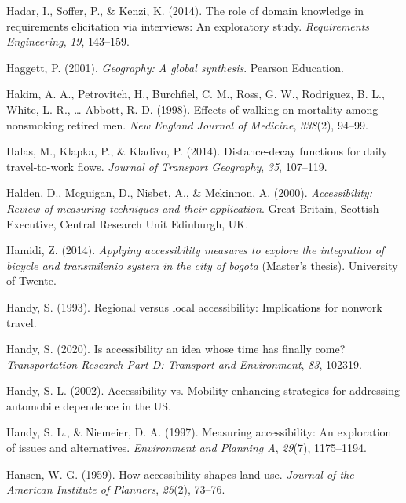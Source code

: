 \documentclass[
11pt, %
oneside, %
english, %
singlespacing, %
]{macthesis} %
\newlength{\cslhangindent}
\newenvironment{CSLReferences}[2] %
 {%
  \setlength{\parindent}{0pt}
  \ifodd #1 \everypar{\setlength{\hangindent}{\cslhangindent}}\ignorespaces\fi
  \ifnum #2 > 0
  \setlength{\parskip}{#2\baselineskip}
  \fi
 }%
 {}
\begin{document}
\begin{CSLReferences}{1}{0}
Hadar, I., Soffer, P., \& Kenzi, K. (2014). The role of domain knowledge in requirements elicitation via interviews: An exploratory study. \emph{Requirements Engineering}, \emph{19}, 143--159.

Haggett, P. (2001). \emph{Geography: A global synthesis}. Pearson Education.

Hakim, A. A., Petrovitch, H., Burchfiel, C. M., Ross, G. W., Rodriguez, B. L., White, L. R., \ldots{} Abbott, R. D. (1998). Effects of walking on mortality among nonsmoking retired men. \emph{New England Journal of Medicine}, \emph{338}(2), 94--99.

Halas, M., Klapka, P., \& Kladivo, P. (2014). Distance-decay functions for daily travel-to-work flows. \emph{Journal of Transport Geography}, \emph{35}, 107--119.

Halden, D., Mcguigan, D., Nisbet, A., \& Mckinnon, A. (2000). \emph{Accessibility: Review of measuring techniques and their application}. Great Britain, Scottish Executive, Central Research Unit Edinburgh, UK.

Hamidi, Z. (2014). \emph{Applying accessibility measures to explore the integration of bicycle and transmilenio system in the city of bogota} (Master's thesis). University of Twente.

Handy, S. (1993). Regional versus local accessibility: Implications for nonwork travel.

Handy, S. (2020). Is accessibility an idea whose time has finally come? \emph{Transportation Research Part D: Transport and Environment}, \emph{83}, 102319.

Handy, S. L. (2002). Accessibility-vs. Mobility-enhancing strategies for addressing automobile dependence in the US.

Handy, S. L., \& Niemeier, D. A. (1997). Measuring accessibility: An exploration of issues and alternatives. \emph{Environment and Planning A}, \emph{29}(7), 1175--1194.

Hansen, W. G. (1959). How accessibility shapes land use. \emph{Journal of the American Institute of Planners}, \emph{25}(2), 73--76.


\end{CSLReferences}
\end{document}
